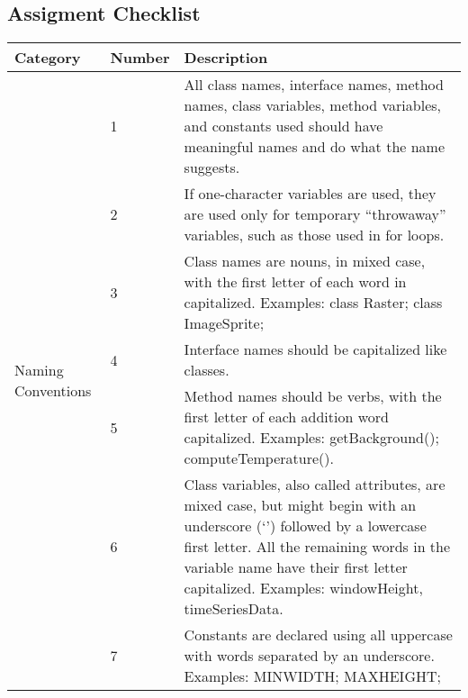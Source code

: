 \documentclass[11pt, a4paper,titlepage]{article}
\begin{document}
\subsection{Assigment Checklist}
\begin{tabularx}{\textwidth}{| X | l | X |}
	\hline \textbf{Category} & \textbf{Number} & \textbf{Description} \\
	\hline
	\multirow{7}{*}{Naming Conventions} & \label{itm:1} 1 & 
	All class names, interface names, method names, class variables, method
	variables, and constants used should have meaningful names and do what
	the name suggests. \\ \cline{2-3}
										& \label{itm:2} 2 &  
	If one-character variables are used, they are used only for temporary
	“throwaway” variables, such as those used in for loops. \\ \cline{2-3}
										& \label{itm:3} 3 &  
										Class names are nouns, in mixed case, with the first letter of each word in
										capitalized. Examples: class Raster; class ImageSprite; \\ \cline{2-3}
										& \label{itm:4} 4 & 
										Interface names should be capitalized like classes. \\ \cline{2-3}
										& \label{itm:5} 5 & 
										Method names should be verbs, with the first letter of each addition word
										capitalized. Examples: getBackground(); computeTemperature(). \\ \cline{2-3}
										& \label{itm:6} 6 &  
										Class variables, also called attributes, are mixed case, but might begin
										with an underscore (‘\textunderscore’) followed by a lowercase first letter. All the
										remaining words in the variable name have their first letter capitalized.
										Examples: \textunderscore windowHeight, timeSeriesData. \\ \cline{2-3}
										& \label{itm:7} 7 &  
										Constants are declared using all uppercase with words separated by an
										underscore. Examples: MIN\textunderscore WIDTH; MAX\textunderscore HEIGHT;	\\ \hline
						\end{tabularx}
\end{document}
